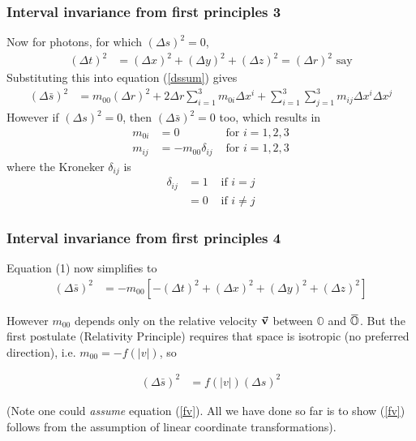 \documentclass[xcolor=x11names,compress]{beamer}
\renewcommand{\(}{\begin{columns}}
\renewcommand{\)}{\end{columns}}
\newcommand{\<}[1]{\begin{column}{#1}}
\renewcommand{\>}{\end{column}}
\newcommand{\overbar}[1]{\mkern 1.5mu\overline{\mkern-1.5mu#1\mkern-1.5mu}\mkern 1.5mu}
\newcommand{\oframe}{\mathbb{O}}
\newcommand{\obarframe}{\overbar{\mathbb{O}}}
\begin{document}
\begin{frame}
\frametitle{Interval invariance from first principles 3}

Now for photons, for which $(\Delta s)^2 = 0$,
\begin{align*}
(\Delta t)^2 & = (\Delta x)^2 + (\Delta y)^2 + (\Delta z)^2 = (\Delta r)^2 \text { say}
\end{align*}
Substituting this into equation (\ref{dssum}) gives
\begin{align*}
(\Delta \bar{s})^2 & = m_{00} (\Delta r)^2 + 2 \Delta r \sum\limits_{i=1}^3 m_{0i}
  \Delta x^i + \sum\limits_{i=1}^3 \sum\limits_{j=1}^3 m_{ij} \Delta x^i \Delta x^j
\end{align*}
However if $(\Delta s)^2 = 0$, then $(\Delta \bar{s})^2 = 0$ too, which results in
\begin{align*}
m_{0i} & = 0 & \text{ for } i=1,2,3 \\
m_{ij} & = -m_{00} \delta_{ij} & \text{ for } i=1,2,3
\end{align*}
where the Kroneker $\delta_{ij}$ is
\begin{align*}
\delta_{ij} & = 1 & \text{ if } i = j \\
            & = 0 & \text{ if } i \ne j
\end{align*}

\end{frame}

\begin{frame}
\frametitle{Interval invariance from first principles 4}

Equation (1) now simplifies to
\begin{align*}
(\Delta \bar{s})^2 & = -m_{00} \left[- (\Delta t)^2 + (\Delta x)^2 + (\Delta y)^2 
+ (\Delta z)^2 \right]
\end{align*}

However $m_{00}$ depends only on the relative velocity $\vec{\bf v}$ 
between $\oframe$ and $\obarframe$.  But the first postulate (Relativity 
Principle) requires that space is isotropic (no preferred direction),  
i.e. $m_{00} = -f(|v|)$, so
\begin{beamerboxesrounded}[upper=uppercol,lower=lowercol,shadow=true]
{}{\begin{align}
(\Delta \bar{s})^2 & = f(|v|) (\Delta s)^2 \label{fv}
\end{align}}
\end{beamerboxesrounded}

(Note one could {\it assume} equation (\ref{fv}).  All we have done so far is to 
show (\ref{fv}) follows from the assumption of linear coordinate transformations).

\end{frame}
\end{document}
